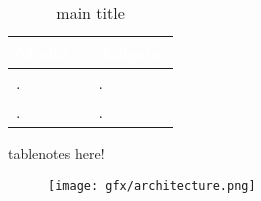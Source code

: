 \begin{table}[H]
	\centering
	\caption[short title]{main title}\label{tab:table}
	\begin{threeparttable}
		\begin{tabular}{|m{0.5\linewidth}|m{0.5\linewidth}|}
			\hline
			\rowcolor{gray}
			\small\textcolor{white}{\textbf{Modul}} & \small\textcolor{white}{\textbf{Aufgabe}} \\
			\hline
			. & .\\
			\hline
			. & .\\
			\hline
		\end{tabular}
		\begin{tablenotes}
			\tiny
			\item tablenotes here!
		\end{tablenotes}
	\end{threeparttable}
\end{table}

\begin{figure}[h]
	\centering
	\texttt{[image: gfx/architecture.png]}
\end{figure}